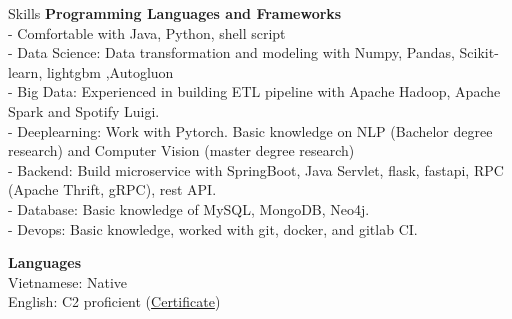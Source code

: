 \documentclass{resume} %
\begin{document}
\begin{rSection}{Skills}
{\bf Programming Languages and Frameworks }
\\ - Comfortable with Java, Python, shell script
\\ - Data Science: Data transformation and modeling with Numpy, Pandas, Scikit-learn, lightgbm ,Autogluon
\\ - Big Data: Experienced in building ETL pipeline with Apache Hadoop, Apache Spark and Spotify Luigi.
\\ - Deeplearning: Work with Pytorch. Basic knowledge on NLP (Bachelor degree research) and Computer Vision (master degree research)
\\ - Backend: Build microservice with SpringBoot, Java Servlet, flask, fastapi, RPC (Apache Thrift, gRPC), rest API. 
\\ - Database: Basic knowledge of MySQL, MongoDB, Neo4j. 
\\ - Devops: Basic knowledge, worked with git, docker, and gitlab CI.


{\bf Languages}
\\Vietnamese: Native
\\English: C2 proficient (\href{https://www.efset.org/cert/o5HAWP}{Certificate})
\end{rSection}




\end{document}
